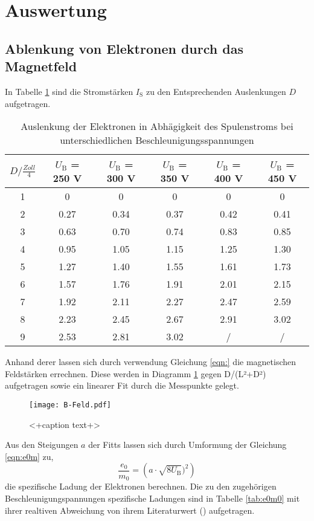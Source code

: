 \section{Auswertung}
\label{sec:Auswertung}
\subsection{Ablenkung von Elektronen durch das Magnetfeld}
In Tabelle \ref{tab:DIS} sind die Stromstärken $I_\text{S}$ zu den Entsprechenden Auslenkungen $D$ aufgetragen.
\begin{table}
  \centering
  \begin{tabular}{c| c c c c c }
    \toprule
    $D / \frac{Zoll}{4}$ & $U_\text{B}$ = 250 V & $U_\text{B}$ = 300 V & $U_\text{B}$ = 350 V & $U_\text{B}$ = 400 V & $U_\text{B}$ = 450 V \\
    \midrule
    1 &	0	&0	&0	&0	&0	\\
    2 &	0.27	&0.34	&0.37	&0.42	&0.41	\\
    3 &	0.63	&0.70	&0.74	&0.83	&0.85	\\
    4 &	0.95	&1.05	&1.15	&1.25	&1.30	\\	
    5 &	1.27	&1.40	&1.55	&1.61	&1.73	\\
    6 &	1.57	&1.76	&1.91	&2.01	&2.15	\\
    7 &	1.92	&2.11 	&2.27	&2.47	&2.59	\\
    8 &	2.23	&2.45	&2.67	&2.91	&3.02	\\
    9 &	2.53	&2.81	&3.02	&/	&/	\\
    \bottomrule
  \end{tabular}
  \caption{Auslenkung der Elektronen in Abhägigkeit des Spulenstroms bei unterschiedlichen Beschleunigungsspannungen}
  \label{tab:DIS}
\end{table}
Anhand derer lassen sich durch verwendung Gleichung \eqref{eqn:} die magnetischen Feldstärken errechnen. Diese werden in Diagramm \ref{fig:bfeld} gegen D/(L²+D²) aufgetragen sowie ein linearer Fit durch die Messpunkte gelegt. 
\begin{figure}
  \centering
  \texttt{[image: B-Feld.pdf]}
  \caption{<+caption text+>}
  \label{fig:bfeld}
\end{figure}
Aus den Steigungen $a$ der Fitts lassen sich durch Umformung der Gleichung \eqref{eqn:e0m} zu,
\begin{equation}
  \frac{e_0}{m_0} = \left( a \cdot \sqrt{8 U_\text{B}} )^2 \right)
  \label{eqn:e0m0}
\end{equation}
die spezifische Ladung der Elektronen berechnen. Die zu den zugehörigen Beschleunigungspannungen spezifische Ladungen sind in Tabelle \ref{tab:e0m0} mit ihrer realtiven Abweichung von ihrem Literaturwert (\cite{spez}) aufgetragen. 
